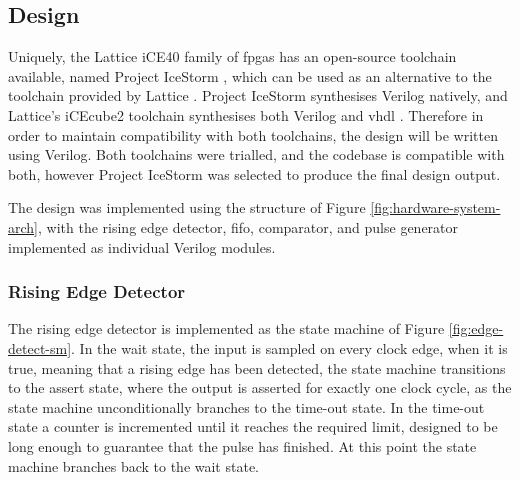 \subsection{ Design}

Uniquely, the Lattice iCE40 family of \glspl{fpga} has an open-source toolchain available, named Project IceStorm \cite{icestorm}, which can be used as an alternative to the toolchain provided by Lattice \cite{icestorm}. Project IceStorm synthesises Verilog natively, and Lattice's iCEcube2 toolchain synthesises both Verilog and \gls{vhdl} \cite[p.10]{lattice2017c} \cite{icestorm}. Therefore in order to maintain compatibility with both toolchains, the design will be written using Verilog. Both toolchains were trialled, and the codebase is compatible with both, however Project IceStorm was selected to produce the final design output.

The design was implemented using the structure of Figure \ref{fig:hardware-system-arch}, with the rising edge detector, \gls{fifo}, comparator, and pulse generator implemented as individual Verilog modules.

\subsubsection{Rising Edge Detector}

The rising edge detector is implemented as the state machine of Figure \ref{fig:edge-detect-sm}. In the wait state, the input is sampled on every clock edge, when it is true, meaning that a rising edge has been detected, the state machine transitions to the assert state, where the output is asserted for exactly one clock cycle, as the state machine unconditionally branches to the time-out state. In the time-out state a counter is incremented until it reaches the required limit, designed to be long enough to guarantee that the pulse has finished. At this point the state machine branches back to the wait state.

